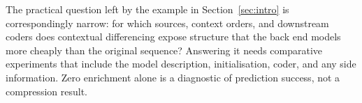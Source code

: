 The practical question left by the example in Section~\ref{sec:intro} is correspondingly narrow:
for which sources, context orders, and downstream coders does contextual differencing expose
structure that the back end models more cheaply than the original sequence?  Answering it needs
comparative experiments that include the model description, initialisation, coder, and any side
information.  Zero enrichment alone is a diagnostic of prediction success, not a compression
result.
